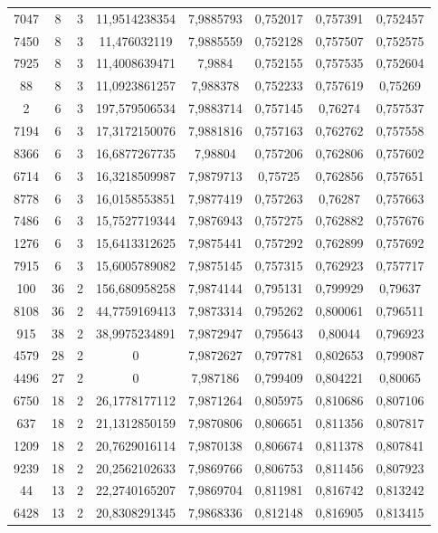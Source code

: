 \begin{longtable}{|c|c|c|c|c|c|c|c|}
7047 & 8 & 3 & 11,9514238354 & 7,9885793 & 0,752017 & 0,757391 & 0,752457 \\
7450 & 8 & 3 & 11,476032119 & 7,9885559 & 0,752128 & 0,757507 & 0,752575 \\
7925 & 8 & 3 & 11,4008639471 & 7,9884 & 0,752155 & 0,757535 & 0,752604 \\
88 & 8 & 3 & 11,0923861257 & 7,988378 & 0,752233 & 0,757619 & 0,75269 \\
2 & 6 & 3 & 197,579506534 & 7,9883714 & 0,757145 & 0,76274 & 0,757537 \\
7194 & 6 & 3 & 17,3172150076 & 7,9881816 & 0,757163 & 0,762762 & 0,757558 \\
8366 & 6 & 3 & 16,6877267735 & 7,98804 & 0,757206 & 0,762806 & 0,757602 \\
6714 & 6 & 3 & 16,3218509987 & 7,9879713 & 0,75725 & 0,762856 & 0,757651 \\
8778 & 6 & 3 & 16,0158553851 & 7,9877419 & 0,757263 & 0,76287 & 0,757663 \\
7486 & 6 & 3 & 15,7527719344 & 7,9876943 & 0,757275 & 0,762882 & 0,757676 \\
1276 & 6 & 3 & 15,6413312625 & 7,9875441 & 0,757292 & 0,762899 & 0,757692 \\
7915 & 6 & 3 & 15,6005789082 & 7,9875145 & 0,757315 & 0,762923 & 0,757717 \\
100 & 36 & 2 & 156,680958258 & 7,9874144 & 0,795131 & 0,799929 & 0,79637 \\
8108 & 36 & 2 & 44,7759169413 & 7,9873314 & 0,795262 & 0,800061 & 0,796511 \\
915 & 38 & 2 & 38,9975234891 & 7,9872947 & 0,795643 & 0,80044 & 0,796923 \\
4579 & 28 & 2 & 0 & 7,9872627 & 0,797781 & 0,802653 & 0,799087 \\
4496 & 27 & 2 & 0 & 7,987186 & 0,799409 & 0,804221 & 0,80065 \\
6750 & 18 & 2 & 26,1778177112 & 7,9871264 & 0,805975 & 0,810686 & 0,807106 \\
637 & 18 & 2 & 21,1312850159 & 7,9870806 & 0,806651 & 0,811356 & 0,807817 \\
1209 & 18 & 2 & 20,7629016114 & 7,9870138 & 0,806674 & 0,811378 & 0,807841 \\
9239 & 18 & 2 & 20,2562102633 & 7,9869766 & 0,806753 & 0,811456 & 0,807923 \\
44 & 13 & 2 & 22,2740165207 & 7,9869704 & 0,811981 & 0,816742 & 0,813242 \\
6428 & 13 & 2 & 20,8308291345 & 7,9868336 & 0,812148 & 0,816905 & 0,813415 \\

\end{longtable}
